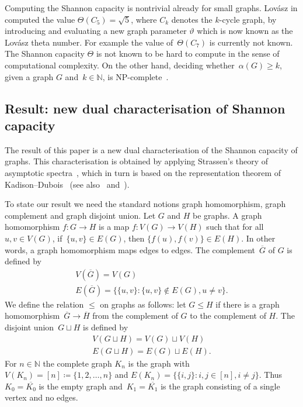 \documentclass[a4paper, fleqn]{amsart}
\theoremstyle{plain}
\theoremstyle{definition}
\newcommand{\NN}{\mathbb{N}}
\newcommand{\jeroen}[1]{#1}
\newcommand{\defin}[1]{#1}
\let\leqx\leqslant
\let\leqx\leqslant
\begin{document}
Computing the Shannon capacity is nontrivial already for small graphs. Lovász in \cite{lovasz1979shannon} computed the value $\Theta(C_5) = \sqrt{5}$, where $C_k$ denotes the $k$-cycle graph, by introducing and evaluating a new graph parameter $\vartheta$ which is now known as the Lovász theta number. For example the value of~$\Theta(C_7)$ is currently not known. The Shannon capacity $\Theta$ is not known to be hard to compute in the sense of computational complexity. On the other hand, deciding whether~\jeroen{$\alpha(G) \geq k$}, given a graph $G$ and~$k\in \NN$, is NP-complete~\cite{MR0378476}. %


\subsection{Result: new dual characterisation of Shannon capacity}
The result of this paper is a new dual characterisation of the Shannon capacity of graphs. This characterisation is obtained by applying Strassen's theory of asymptotic spectra~\cite{strassen1988asymptotic}, which in turn is based on the representation theorem of Kadison--Dubois~\cite{MR707730} (see also~\cite{MR1829790} and~\cite{MR2383959}). %

%

To state \jeroen{our result}
we need the standard notions graph homomorphism, graph complement and graph disjoint union.
Let $G$ and $H$ be graphs.
A \defin{graph homomorphism} $f : G \to H$ is a map $f : V(G) \to V(H)$ such that for all $u,v \in V(G)$, if~$\{u,v\} \in E(G)$, then $\{f(u), f(v)\} \in E(H)$. In other words, a graph homomorphism maps edges to edges.
The \defin{complement}~$\overline{G}$ of $G$ is defined by
\begin{gather*}
V(\overline{G}) = V(G)\\ 
E(\overline{G}) = \bigl\{\{u,v\} : \{u,v\} \not\in E(G), u\neq v\bigr\}.
\end{gather*}
We define the relation $\leqx$ on graphs as follows: let $G \leqx H$
if there is a graph homomorphism~$\overline{G} \to \overline{H}$ from the complement of $G$ to the complement of $H$.
%
%
%
%
%
The \defin{disjoint union}~$G \sqcup H$ is defined by
\begin{gather*}
V(G \sqcup H) = V(G) \sqcup V(H)\\ %
E(G \sqcup H) = E(G) \sqcup E(H). %
%
\end{gather*}
%
%
%
%
%
For $n \in \NN$ the \defin{complete graph} $K_n$ is the graph with $V(K_n) = [n] \coloneqq \{1,2,\ldots, n\}$ and $E(K_n) = \{\{i,j\} : i,j \in [n], i\neq j\}$. Thus $K_0 = \overline{K_0}$ is the empty graph and~$K_1 = \overline{K_1}$ is the graph consisting of a single vertex and no edges.
\end{document}
